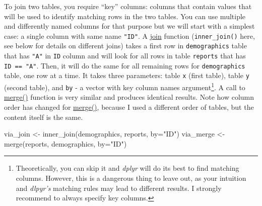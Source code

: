 \documentclass[
]{book}
\newenvironment{Shaded}{\begin{snugshade}}{\end{snugshade}}
\newcommand{\AttributeTok}[1]{\textcolor[rgb]{0.77,0.63,0.00}{#1}}
\newcommand{\FunctionTok}[1]{\textcolor[rgb]{0.00,0.00,0.00}{#1}}
\newcommand{\NormalTok}[1]{#1}
\newcommand{\OtherTok}[1]{\textcolor[rgb]{0.56,0.35,0.01}{#1}}
\newcommand{\StringTok}[1]{\textcolor[rgb]{0.31,0.60,0.02}{#1}}
\begin{document}
To join two tables, you require ``key'' columns: columns that contain values that will be used to identify matching rows in the two tables. You can use multiple and differently named columns for that purpose but we will start with a simplest case: a single column with same name \texttt{"ID"}. A \href{https://dplyr.tidyverse.org/reference/mutate-joins.html}{join} function (\texttt{inner\_join()} here, see below for details on different joins) takes a first row in \texttt{demographics} table that has \texttt{"A"} in \texttt{ID} column and will look for all rows in table \texttt{reports} that has \texttt{ID\ ==\ "A"}. Then, it will do the same for all remaining rows for \texttt{demographics} table, one row at a time. It takes three parameters: table \texttt{x} (first table), table \texttt{y} (second table), and \texttt{by} - a vector with key column names argument\footnote{Theoretically, you can skip it and \emph{dplyr} will do its best to find matching columns. However, this is a dangerous thing to leave out, as your intuition and \emph{dlpyr's} matching rules may lead to different results. I strongly recommend to always specify key columns.}. A call to \href{https://stat.ethz.ch/R-manual/R-devel/library/base/html/merge.html}{merge()} function is very similar and produces identical results. Note how column order has changed for \href{https://stat.ethz.ch/R-manual/R-devel/library/base/html/merge.html}{merge()}, because I used a different order of tables, but the content itself is the same.

\begin{Shaded}
\begin{Highlighting}[]
\NormalTok{via\_join }\OtherTok{\textless{}{-}} \FunctionTok{inner\_join}\NormalTok{(demographics, reports, }\AttributeTok{by=}\StringTok{"ID"}\NormalTok{)}
\NormalTok{via\_merge }\OtherTok{\textless{}{-}} \FunctionTok{merge}\NormalTok{(reports, demographics, }\AttributeTok{by=}\StringTok{"ID"}\NormalTok{)}
\end{Highlighting}
\end{Shaded}
\end{document}
